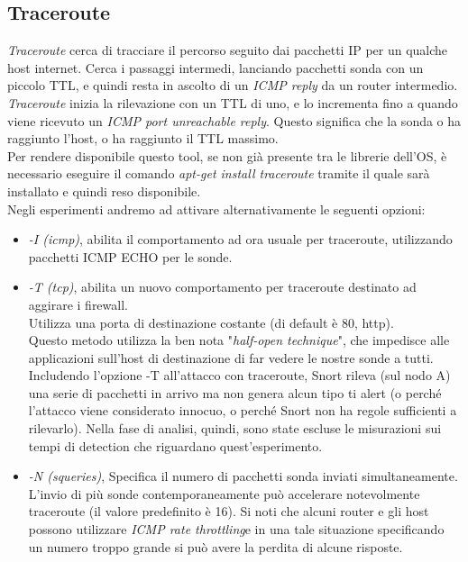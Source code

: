 	\subsection{Traceroute}
	\textit{Traceroute} cerca di tracciare il percorso seguito dai pacchetti IP per un qualche host internet. Cerca i passaggi intermedi, lanciando pacchetti sonda con un piccolo TTL, e quindi resta in ascolto di un \textit{ICMP reply} da un router intermedio. \textit{Traceroute} inizia la rilevazione con un TTL di uno, e lo incrementa fino a quando viene ricevuto un \textit{ICMP port unreachable reply}. Questo significa che la sonda o ha raggiunto l'host, o ha raggiunto il TTL massimo.\\
	Per rendere disponibile questo tool, se non già presente tra le librerie dell'OS, è necessario eseguire il comando \textit{apt-get install traceroute} tramite il quale sarà installato e quindi reso disponibile.\\
	Negli esperimenti andremo ad attivare alternativamente le seguenti opzioni:
	\begin{itemize}
	    \item \textit{-I (icmp)}, abilita il comportamento ad ora usuale per traceroute, utilizzando pacchetti ICMP ECHO per le sonde.
	    \item \textit{-T (tcp)}, abilita un nuovo comportamento per traceroute destinato ad aggirare i firewall.\\ Utilizza una porta di destinazione costante (di default è 80, http).\\
	        Questo metodo utilizza la ben nota "\textit{half-open technique}", che impedisce alle applicazioni sull'host di destinazione di far vedere le nostre sonde a tutti.\\
	        Includendo l'opzione -T all'attacco con traceroute, Snort rileva (sul nodo A) una serie di pacchetti in arrivo ma non genera alcun tipo ti alert (o perché l'attacco viene considerato innocuo, o perché Snort non ha regole sufficienti a rilevarlo). Nella fase di analisi, quindi, sono state escluse le misurazioni sui tempi di detection che riguardano quest'esperimento.
	
	    \item \textit{-N (squeries)}, Specifica il numero di pacchetti sonda inviati simultaneamente.\\
	    L'invio di più sonde contemporaneamente può accelerare notevolmente traceroute (il valore predefinito è 16). Si noti che alcuni router e gli host possono utilizzare \textit{ICMP  rate  throttling}e in una tale situazione specificando un numero troppo grande si può avere la perdita di alcune risposte.
	\end{itemize}
	
